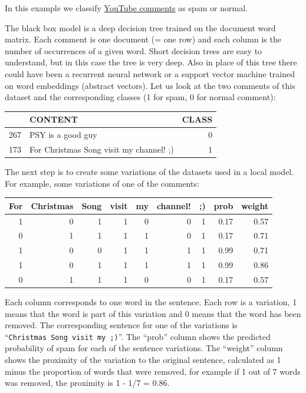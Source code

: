 \documentclass[
  12pt,
]{krantz}
\begin{document}
In this example we classify \protect\hyperlink{spam-data}{YouTube comments} as spam or normal.

The black box model is a deep decision tree trained on the document word matrix.
Each comment is one document (= one row) and each column is the number of occurrences of a given word.
Short decision trees are easy to understand, but in this case the tree is very deep.
Also in place of this tree there could have been a recurrent neural network or a support vector machine trained on word embeddings (abstract vectors).
Let us look at the two comments of this dataset and the corresponding classes (1 for spam, 0 for normal comment):

\begin{tabular}{l|l|r}
\hline
  & CONTENT & CLASS\\
\hline
267 & PSY is a good guy & 0\\
\hline
173 & For Christmas Song visit my channel! ;) & 1\\
\hline
\end{tabular}

The next step is to create some variations of the datasets used in a local model.
For example, some variations of one of the comments:

\begin{tabular}{r|r|r|r|r|r|r|r|r}
\hline
For & Christmas & Song & visit & my & channel! & ;) & prob & weight\\
\hline
1 & 0 & 1 & 1 & 0 & 0 & 1 & 0.17 & 0.57\\
\hline
0 & 1 & 1 & 1 & 1 & 0 & 1 & 0.17 & 0.71\\
\hline
1 & 0 & 0 & 1 & 1 & 1 & 1 & 0.99 & 0.71\\
\hline
1 & 0 & 1 & 1 & 1 & 1 & 1 & 0.99 & 0.86\\
\hline
0 & 1 & 1 & 1 & 0 & 0 & 1 & 0.17 & 0.57\\
\hline
\end{tabular}

Each column corresponds to one word in the sentence.
Each row is a variation, 1 means that the word is part of this variation and 0 means that the word has been removed.
The corresponding sentence for one of the variations is ``\texttt{Christmas\ Song\ visit\ my\ ;)}''.
The ``prob'' column shows the predicted probability of spam for each of the sentence variations.
The ``weight'' column shows the proximity of the variation to the original sentence, calculated as 1 minus the proportion of words that were removed, for example if 1 out of 7 words was removed, the proximity is 1 - 1/7 = 0.86.
\end{document}
